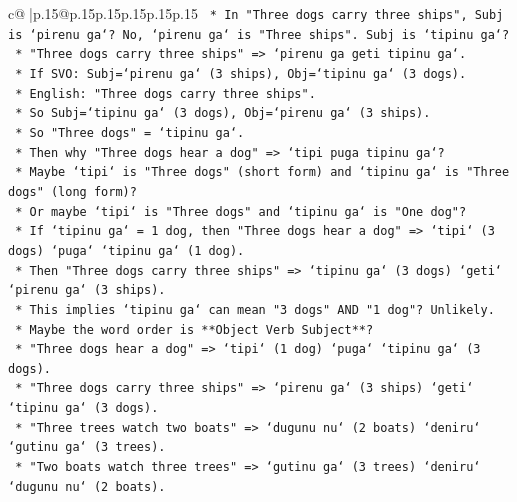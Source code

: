 \documentclass{article}
\begin{document}
{\begin{supertabular}{c@{$\;$}|p{.15\linewidth}@{}p{.15\linewidth}p{.15\linewidth}p{.15\linewidth}p{.15\linewidth}p{.15\linewidth}}
{{{\texttt{                                *   In "Three dogs carry three ships", Subj is `pirenu ga`? No, `pirenu ga` is "Three ships". Subj is `tipinu ga`?} \\
\texttt{                                *   "Three dogs carry three ships" => `pirenu ga geti tipinu ga`.} \\
\texttt{                                    *   If SVO: Subj=`pirenu ga` (3 ships), Obj=`tipinu ga` (3 dogs).} \\
\texttt{                                    *   English: "Three dogs carry three ships".} \\
\texttt{                                    *   So Subj=`tipinu ga` (3 dogs), Obj=`pirenu ga` (3 ships).} \\
\texttt{                                    *   So "Three dogs" = `tipinu ga`.} \\
\texttt{                                    *   Then why "Three dogs hear a dog" => `tipi puga tipinu ga`?} \\
\texttt{                                    *   Maybe `tipi` is "Three dogs" (short form) and `tipinu ga` is "Three dogs" (long form)?} \\
\texttt{                                    *   Or maybe `tipi` is "Three dogs" and `tipinu ga` is "One dog"?} \\
\texttt{                                    *   If `tipinu ga` = 1 dog, then "Three dogs hear a dog" => `tipi` (3 dogs) `puga` `tipinu ga` (1 dog).} \\
\texttt{                                    *   Then "Three dogs carry three ships" => `tipinu ga` (3 dogs) `geti` `pirenu ga` (3 ships).} \\
\texttt{                                    *   This implies `tipinu ga` can mean "3 dogs" AND "1 dog"? Unlikely.} \\
\texttt{                                    *   Maybe the word order is **Object Verb Subject**?} \\
\texttt{                                        *   "Three dogs hear a dog" => `tipi` (1 dog) `puga` `tipinu ga` (3 dogs).} \\
\texttt{                                        *   "Three dogs carry three ships" => `pirenu ga` (3 ships) `geti` `tipinu ga` (3 dogs).} \\
\texttt{                                        *   "Three trees watch two boats" => `dugunu nu` (2 boats) `deniru` `gutinu ga` (3 trees).} \\
\texttt{                                        *   "Two boats watch three trees" => `gutinu ga` (3 trees) `deniru` `dugunu nu` (2 boats).} \\
}}}
\end{supertabular}}
\end{document}

